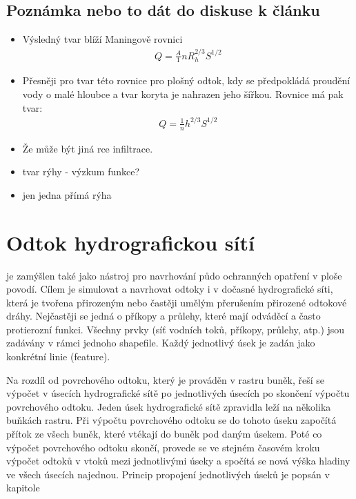 




\subsection{Poznámka nebo to dát do diskuse k článku} 
\begin{itemize}
\item Výsledný tvar blíží Maningově rovnici
\begin{eqnarray}
Q =\frac A {1}{n} R_{h}^{2/3} S^{1/2}
\end{eqnarray}
\item Přesněji pro tvar této rovnice pro plošný odtok, kdy se předpokládá proudění vody  o malé hloubce a tvar koryta je nahrazen jeho šířkou. Rovnice má pak tvar:
\begin{eqnarray}
Q =\frac {1}{n} h^{2/3} S^{1/2}
\end{eqnarray}
\item Že může být jiná rce infiltrace.
\item tvar rýhy - výzkum funkce?
\item jen jedna přímá rýha
\end{itemize}

\section{Odtok hydrografickou sítí} \label{sec:tokyodtok}


\smod je zamýšlen také jako nástroj pro navrhování půdo ochranných opatření v ploše povodí. Cílem je simulovat a navrhovat odtoky i v dočasné hydrografické síti, která je tvořena přirozeným nebo častěji umělým přerušením přirozené odtokové dráhy. Nejčastěji se jedná o příkopy a průlehy, které mají odváděcí a často protierozní funkci. 
Všechny prvky (síť vodních toků, příkopy, průlehy, atp.) jsou zadávány v rámci jednoho shapefile. Každý jednotlivý úsek je zadán jako konkrétní linie (feature). 

Na rozdíl od povrchového odtoku, který je prováděn v rastru buněk, řeší se výpočet v úsecích hydrografické sítě  po jednotlivých úsecích po skončení výpočtu povrchového odtoku. Jeden úsek hydrografické sítě zpravidla leží na několika buňkách rastru. Při výpočtu povrchového odtoku se do tohoto úseku započítá přítok ze všech buněk, které vtékají do buněk pod daným úsekem. Poté co výpočet povrchového odtoku skončí, provede se ve stejném časovém kroku výpočet odtoků v vtoků mezi jednotlivými úseky a spočítá se nová výška hladiny ve všech úsecích najednou. Princip propojení jednotlivých úseků je popsán v kapitole 

